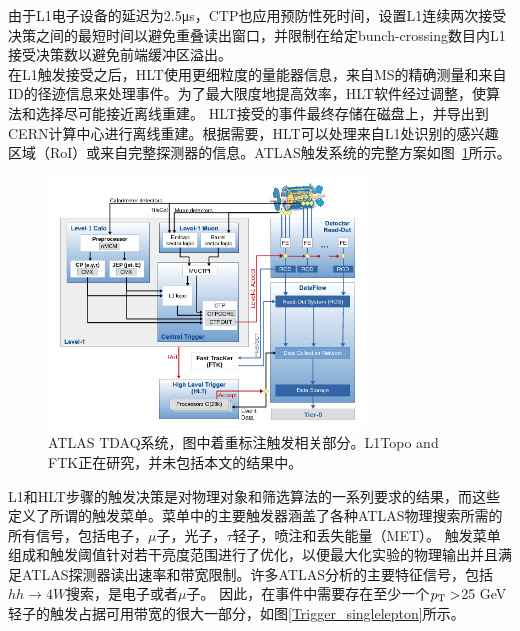 由于L1电子设备的延迟为2.5μs，CTP也应用预防性死时间，设置L1连续两次接受决策之间的最短时间以避免重叠读出窗口，并限制在给定bunch-crossing数目内L1接受决策数以避免前端缓冲区溢出。\\
在L1触发接受之后，HLT使用更细粒度的量能器信息，来自MS的精确测量和来自ID的径迹信息来处理事件。为了最大限度地提高效率，HLT软件经过调整，使算法和选择尽可能接近离线重建。
HLT接受的事件最终存储在磁盘上，并导出到CERN计算中心进行离线重建。根据需要，HLT可以处理来自L1处识别的感兴趣区域（RoI）或来自完整探测器的信息。ATLAS触发系统的完整方案如图~\ref{fig:ATLAS_TDAQ}所示。
\begin{figure}[h]
\begin{center}
\includegraphics[width=0.75\textwidth]{fig/content_tdaq_figures_tdaq-run2-schematic.png}
\caption{ATLAS TDAQ系统\cite{Aaboud2017}，图中着重标注触发相关部分。L1Topo and FTK正在研究，并未包括本文的结果中。} \label{fig:ATLAS_TDAQ}
\end{center}
\end{figure}
L1和HLT步骤的触发决策是对物理对象和筛选算法的一系列要求的结果，而这些定义了所谓的触发菜单。菜单中的主要触发器涵盖了各种ATLAS物理搜索所需的所有信号，包括电子，$\mu$子，光子，$\tau$轻子，喷注和丢失能量（MET）。
触发菜单组成和触发阈值针对若干亮度范围进行了优化，以便最大化实验的物理输出并且满足ATLAS探测器读出速率和带宽限制。许多ATLAS分析的主要特征信号，包括$hh\rightarrow 4W$搜索，是电子或者$\mu$子。 因此，在事件中需要存在至少一个$p_{\text{T}}>$25 GeV轻子的触发占据可用带宽的很大一部分，如图\ref{Trigger_singlelepton}所示。
